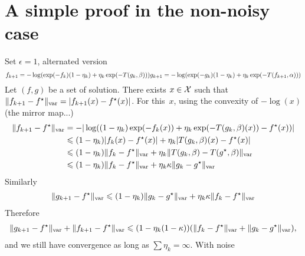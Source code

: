 \documentclass[a4paper, 10pt]{article}
\begin{document}
\section{A simple proof in the non-noisy case}

Set $\epsilon = 1$, alternated version
\begin{equation}
    f_{k+1} =  - \log (\exp(-f_k) (1 - \eta_k) + \eta_k \exp(-T(g_k, \beta))) \\ 
    g_{k+1} =  - \log (\exp(-g_k) (1 - \eta_k) + \eta_k \exp(-T(f_{k+1}, \alpha)))
\end{equation}
Let $(f, g)$ be a set of solution. There exists $x \in \mathcal{X}$ such that $\Vert
f_{k+1} - f^\star \Vert_{\text{var}} = | f_{k+1}(x) - f^\star(x) |$. For this~$x$,
using the convexity of $- \log(x)$ (the mirror map...)
\begin{align}
    \Vert f_{k+1} - f^\star \Vert_{\text{var}}
    &=
    - | \log((1 - \eta_k) \exp(-f_k(x)) + \eta_k \exp(-T(g_k, \beta)(x)) - f^\star(x)) | \\
    &\leqslant (1 - \eta_k) | f_k(x) - f^\star(x)| + \eta_k | T(g_k,\beta)(x) - f^\star(x)| \\
    &\leqslant (1 - \eta_k) \Vert f_k - f^\star \Vert_{\text{var}} + \eta_k
    \Vert T(g_k,\beta) - T(g^\star, \beta) \Vert_{\text{var}} \\
    &\leqslant (1 - \eta_k) \Vert f_k - f^\star \Vert_{\text{var}}
     + \eta_k \kappa \Vert g_k - g^\star \Vert_{\text{var}}
\end{align}
Similarly
\begin{align}
    \Vert g_{k+1} - f^\star \Vert_{\text{var}} \leqslant
    (1 - \eta_k) \Vert g_k - g^\star \Vert_{\text{var}} +
     \eta_k \kappa \Vert f_k - f^\star \Vert_{\text{var}}
\end{align}
Therefore
\begin{align}
    \Vert g_{k+1} - f^\star \Vert_{\text{var}} + \Vert f_{k+1} - f^\star \Vert_{\text{var}} \leqslant
    (1 - \eta_k ( 1 - \kappa)) ( \Vert f_k - f^\star \Vert_{\text{var}} 
     + \Vert g_k - g^\star \Vert_{\text{var}} ),
\end{align}
and we still have convergence as long as $\sum \eta_k = \infty$. With noise

\printbibliography
\end{document}
